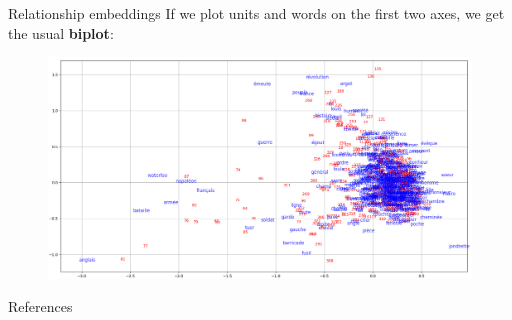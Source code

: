 \documentclass[10pt]{beamer}
\newcommand{\imp}[1]{\textbf{\color{cyan}#1}}
\begin{document}
	\begin{frame}{Relationship embeddings}
		If we plot units and words on the first two axes, we get the usual \imp{biplot}:
		\begin{figure}
			\centering
			\includegraphics[width=\textwidth]{img/biplot.png}
		\end{figure}
	\end{frame}
	
	
	\appendix
	
	\begin{frame}[shrink=40, fragile]{References}
		\begin{multicols}{2}
			
			
		\end{multicols}
	\end{frame}
	
\end{document}
